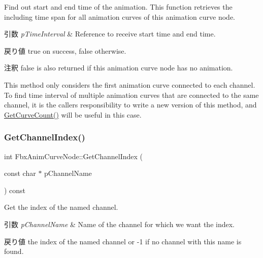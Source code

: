 Find out start and end time of the animation. This function retrieves the including time span for all animation curves of this animation curve node. 
\begin{DoxyParams}{引数}
{\em p\+Time\+Interval} & Reference to receive start time and end time. \\
\hline
\end{DoxyParams}
\begin{DoxyReturn}{戻り値}
{\ttfamily true} on success, {\ttfamily false} otherwise. 
\end{DoxyReturn}
\begin{DoxyRemark}{注釈}
{\ttfamily false} is also returned if this animation curve node has no animation. 

This method only considers the first animation curve connected to each channel. To find time interval of multiple animation curves that are connected to the same channel, it is the caller\textquotesingle{}s responsibility to write a new version of this method, and \hyperlink{class_fbx_anim_curve_node_a41d28a650fa90706d1c67ad5f56530b5}{Get\+Curve\+Count()} will be useful in this case. 
\end{DoxyRemark}
\mbox{\label{class_fbx_anim_curve_node_a8ba8427aa3f99361aaf23cee44439015}} 
\subsubsection{\texorpdfstring{Get\+Channel\+Index()}{GetChannelIndex()}}
{\footnotesize\ttfamily int Fbx\+Anim\+Curve\+Node\+::\+Get\+Channel\+Index (\begin{DoxyParamCaption}\item[{const char $\ast$}]{p\+Channel\+Name }\end{DoxyParamCaption}) const}

Get the index of the named channel. 
\begin{DoxyParams}{引数}
{\em p\+Channel\+Name} & Name of the channel for which we want the index. \\
\hline
\end{DoxyParams}
\begin{DoxyReturn}{戻り値}
the index of the named channel or -\/1 if no channel with this name is found. 
\end{DoxyReturn}
\mbox{\label{class_fbx_anim_curve_node_a1ad770dcc06ec0638103935e4dfede3c}} 
